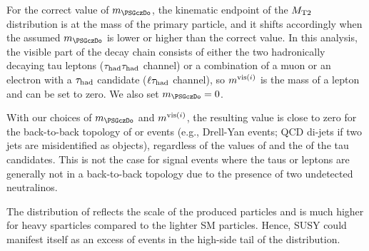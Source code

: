 For the correct value of $m_{\PSGczDo}$, the kinematic endpoint of the ${M_{\rm T2}}$ distribution is at the mass of the primary particle, and it shifts accordingly when the assumed $m_{\PSGczDo}$ is lower or higher than the correct value. In this analysis, 
the visible part of the decay chain consists of either the two hadronically decaying tau leptons ($\tau_{\rm had} \tau_{\rm had}$ channel)
or a combination of a muon or an electron with a $\tau_{\rm had}$ candidate ($\ell\tau_{\rm had}$ channel), so $m^{{\rm vis}(i)}$ is the mass of a lepton and can be set to zero. We also set $m_{\PSGczDo}=0$. 

With  our choices of $m_{\PSGczDo}$ and $m^{{\rm vis}(i)}$, the resulting \mttwo value is close to zero for the 
back-to-back topology of \tauTau or \leptonTau  
events (e.g., Drell-Yan events; QCD di-jets if two jets are misidentified as \Tau objects), regardless of the values of \MPT and the \PT of 
the tau candidates. This is not the case for signal events where the taus or leptons are generally not in a back-to-back topology due 
to the presence of two undetected neutralinos.

The distribution of \mttwo reflects the scale of the produced particles and is much higher for heavy sparticles
compared to the lighter SM particles. Hence, SUSY 
could manifest itself
as an excess of events in the high-side tail of the \mttwo distribution.
